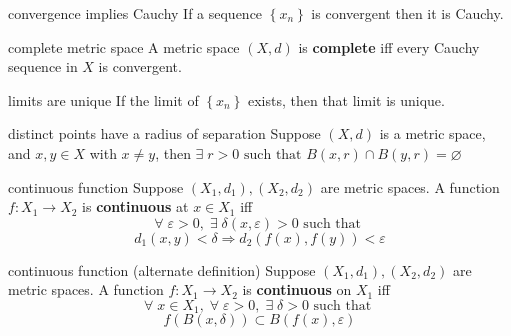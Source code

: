 \documentclass[avery5371,grid]{flashcards}
\newcommand{\st}{\textrm{ such that }}
\begin{document}
\begin{flashcard}[Theorem]{convergence implies Cauchy}
If a sequence $\left\{ x_n \right\}$ is convergent then it is Cauchy.
\end{flashcard}

\begin{flashcard}[Definition]{complete metric space}
A metric space $(X,d)$ is \mbox{\textbf{complete}} iff every Cauchy sequence
in $X$ is convergent.
\end{flashcard}

\begin{flashcard}[Theorem]{limits are unique}
If the limit of $\left\{ x_n \right\}$ exists, then that limit is unique.
\end{flashcard}

\begin{flashcard}[Theorem]{distinct points have a radius of separation}
Suppose $(X,d)$ is a metric space, and $x,y \in X$ with $x \neq y$, then
$\exists \; r > 0 \st B(x,r) \cap B(y,r) = \varnothing$
\end{flashcard}

\begin{flashcard}[Definition]{continuous function}
Suppose $(X_1,d_1), (X_2, d_2)$ are metric spaces.  A function
$f:X_1 \rightarrow X_2$ is \mbox{\textbf{continuous}} at $x \in X_1$ iff
\begin{equation*}
\forall \; \varepsilon >0, \; \exists \; \delta (x,\varepsilon) >0 \st 
\end{equation*}
\begin{equation*}
d_1(x,y) < \delta \Rightarrow d_2(f(x), f(y)) < \varepsilon
\end{equation*}
\end{flashcard}

\begin{flashcard}[Definition]{continuous function (alternate definition)}
Suppose $(X_1,d_1), (X_2, d_2)$ are metric spaces.  A function
$f:X_1 \rightarrow X_2$ is \mbox{\textbf{continuous}} on $X_1$ iff
\begin{equation*}
\forall \; x \in X_1, \; \forall \; \varepsilon >0, \; \exists \; \delta >0 \st 
\end{equation*}
\begin{equation*}
f(B(x,\delta)) \subset B(f(x), \varepsilon)
\end{equation*}
\end{flashcard}
\end{document}
